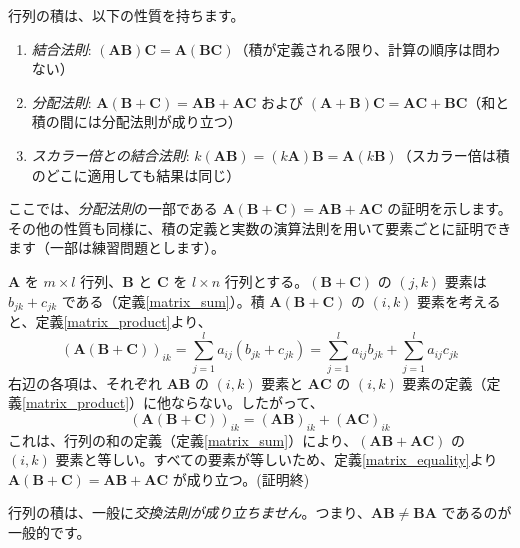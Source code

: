 \begin{thm}[行列の積の性質] \label{matrix_product_property}
行列の積は、以下の性質を持ちます。
\begin{enumerate}
\item \emph{結合法則}: $(\bm{A}\bm{B})\bm{C} = \bm{A}(\bm{B}\bm{C})$（積が定義される限り、計算の順序は問わない）
\item \emph{分配法則}: $\bm{A}(\bm{B} + \bm{C}) = \bm{A}\bm{B} + \bm{A}\bm{C}$ および $(\bm{A} + \bm{B})\bm{C} = \bm{A}\bm{C} + \bm{B}\bm{C}$（和と積の間には分配法則が成り立つ）
\item \emph{スカラー倍との結合法則}: $k(\bm{A}\bm{B}) = (k\bm{A})\bm{B} = \bm{A}(k\bm{B})$（スカラー倍は積のどこに適用しても結果は同じ）
\end{enumerate}
\begin{proof*}
ここでは、\emph{分配法則}の一部である $\bm{A}(\bm{B} + \bm{C}) = \bm{A}\bm{B} + \bm{A}\bm{C}$ の証明を示します。その他の性質も同様に、積の定義と実数の演算法則を用いて要素ごとに証明できます（一部は練習問題とします）。\par
$\bm{A}$ を $m \times l$ 行列、$\bm{B}$ と $\bm{C}$ を $l \times n$ 行列とする。$(\bm{B} + \bm{C})$ の $(j,k)$ 要素は $b_{jk} + c_{jk}$ である（定義\ref{matrix_sum}）。積 $\bm{A}(\bm{B} + \bm{C})$ の $(i,k)$ 要素を考えると、定義\ref{matrix_product}より、
\[(\bm{A}(\bm{B} + \bm{C}))_{ik} = \sum_{j=1}^{l} a_{ij}(b_{jk} + c_{jk})= \sum_{j=1}^{l} a_{ij}b_{jk} + \sum_{j=1}^{l} a_{ij}c_{jk}\]
右辺の各項は、それぞれ $\bm{A}\bm{B}$ の $(i,k)$ 要素と $\bm{A}\bm{C}$ の $(i,k)$ 要素の定義（定義\ref{matrix_product}）に他ならない。したがって、
\[(\bm{A}(\bm{B} + \bm{C}))_{ik} = (\bm{A}\bm{B})_{ik} + (\bm{A}\bm{C})_{ik}\]
これは、行列の和の定義（定義\ref{matrix_sum}）により、$(\bm{A}\bm{B} + \bm{A}\bm{C})$ の $(i,k)$ 要素と等しい。すべての要素が等しいため、定義\ref{matrix_equality}より $\bm{A}(\bm{B} + \bm{C}) = \bm{A}\bm{B} + \bm{A}\bm{C}$ が成り立つ。(証明終)
\end{proof*}
\end{thm}

\begin{rmk*}
行列の積は、一般に\emph{交換法則が成り立ちません}。つまり、$\bm{A}\bm{B} \neq \bm{B}\bm{A}$ であるのが一般的です。
\end{rmk*}

